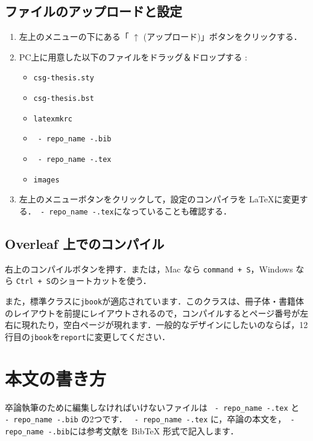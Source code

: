 \documentclass[jlreq,12pt,twoside]{jsreport}
\begin{document}
\section{ファイルのアップロードと設定}

\begin{enumerate}
  \item 左上のメニューの下にある「 $\uparrow$ (アップロード)」ボタンをクリックする．
  \item PC上に用意した以下のファイルをドラッグ＆ドロップする : 
    \begin{itemize}
      \item \texttt{csg-thesis.sty}
      \item \texttt{csg-thesis.bst}
      \item \texttt{latexmkrc}
      \item \texttt{ {{- repo_name -}}.bib}
      \item \texttt{ {{- repo_name -}}.tex}
      \item \texttt{images}
    \end{itemize}
   \item 左上のメニューボタンをクリックして，設定のコンパイラを \LaTeX に変更する．\texttt{ {{- repo_name -}}.tex}になっていることも確認する．
\end{enumerate}

\section{Overleaf 上でのコンパイル}

右上のコンパイルボタンを押す．または，Mac なら \texttt{command + S}，Windows なら \texttt{Ctrl + S}のショートカットを使う．

また，標準クラスに\texttt{jbook}が適応されています．このクラスは、冊子体・書籍体のレイアウトを前提にレイアウトされるので，コンパイルするとページ番号が左右に現れたり，空白ページが現れます．一般的なデザインにしたいのならば，12行目の\texttt{jbook}を\texttt{report}に変更してください．

\chapter{本文の書き方}

卒論執筆のために編集しなければいけないファイルは \texttt{ {{- repo_name -}}.tex} と \texttt{ {{- repo_name -}}.bib} の2つです．
\texttt{ {{- repo_name -}}.tex} に，卒論の本文を，\texttt{ {{- repo_name -}}.bib}には参考文献を BibTeX 形式で記入します．
\end{document}
